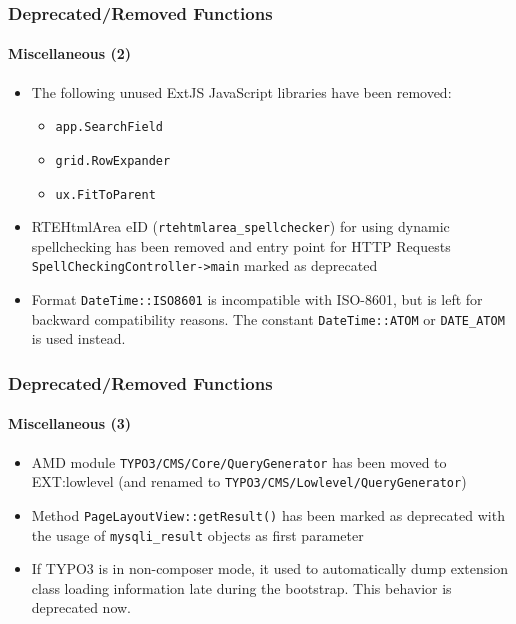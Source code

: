 \begin{frame}[fragile]
	\frametitle{Deprecated/Removed Functions}
	\framesubtitle{Miscellaneous (2)}

	\begin{itemize}

		\item The following unused ExtJS JavaScript libraries have been removed:

			\begin{itemize}
				\item \texttt{app.SearchField}
				\item \texttt{grid.RowExpander}
				\item \texttt{ux.FitToParent}
			\end{itemize}

		\item RTEHtmlArea eID (\texttt{rtehtmlarea\_spellchecker}) for using
			dynamic spellchecking has been removed and entry point for HTTP Requests
			\texttt{SpellCheckingController->main} marked as deprecated

		\item Format \texttt{DateTime::ISO8601} is incompatible with ISO-8601,
			but is left for backward compatibility reasons.
			The constant \texttt{DateTime::ATOM} or \texttt{DATE\_ATOM} is used instead.

	\end{itemize}

\end{frame}


\begin{frame}[fragile]
	\frametitle{Deprecated/Removed Functions}
	\framesubtitle{Miscellaneous (3)}

	\begin{itemize}

		\item AMD module \texttt{TYPO3/CMS/Core/QueryGenerator} has been moved to EXT:lowlevel\newline
			\small
				(and renamed to \texttt{TYPO3/CMS/Lowlevel/QueryGenerator})
			\normalsize

		\item Method \texttt{PageLayoutView::getResult()} has been marked as deprecated with
			the usage of \texttt{mysqli\_result} objects as first parameter

		\item If TYPO3 is in non-composer mode, it used to automatically dump extension class
			loading information late during the bootstrap. This behavior is deprecated now.
	\end{itemize}

\end{frame}

